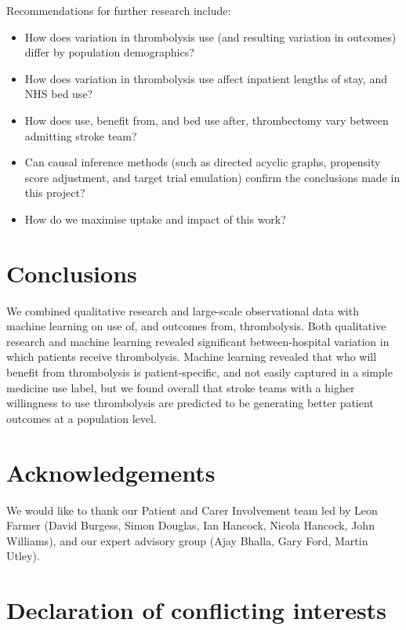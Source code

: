 Recommendations for further research include:

\begin{itemize}

    \item How does variation in thrombolysis use (and resulting variation in outcomes) differ by population demographics?

    \item How does variation in thrombolysis use affect inpatient lengths of stay, and NHS bed use?

    \item How does use, benefit from, and bed use after, thrombectomy vary between admitting stroke team?

    \item Can causal inference methods (such as directed acyclic graphs, propensity score adjustment, and target trial emulation) confirm the conclusions made in this project?

    \item How do we maximise uptake and impact of this work?
    
\end{itemize}


\section{Conclusions}

We combined qualitative research and large-scale observational data with machine learning on use of, and outcomes from, thrombolysis. Both qualitative research and machine learning revealed significant between-hospital variation in which patients receive thrombolysis. Machine learning revealed that who will benefit from thrombolysis is patient-specific, and not easily captured in a simple medicine use label, but we found overall that stroke teams with a higher willingness to use thrombolysis are predicted to be generating better patient outcomes at a population level.

\section{Acknowledgements}

We would like to thank our Patient and Carer Involvement team led by Leon Farmer (David Burgess, Simon Douglas, Ian Hancock, Nicola Hancock, John Williams), and our expert advisory group (Ajay Bhalla, Gary Ford, Martin Utley).

\section{Declaration of conflicting interests}

